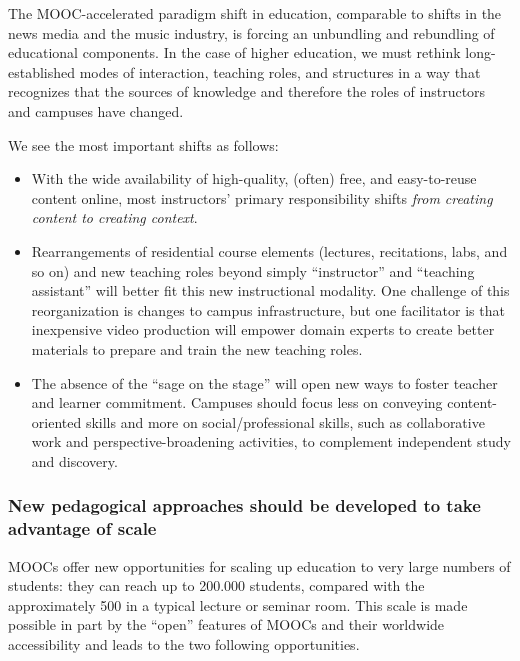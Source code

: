 \documentclass[a4paper,UKenglish]{dagman}
\begin{document}
The MOOC-accelerated paradigm shift in education, comparable to shifts in the news media and the
music industry, is forcing an unbundling and rebundling of educational components. In the case of
higher education, we must rethink long-established modes of interaction, teaching roles, and
structures in a way that recognizes that the sources of knowledge and therefore the roles of
instructors and campuses have changed.

We see the most important shifts as follows:

\begin{itemize}

\item With the wide availability of high-quality, (often) free, and easy-to-reuse content online,
  most instructors' primary responsibility shifts \emph{from creating content to creating context}.

\item Rearrangements of residential course elements (lectures, recitations, labs, and so on) and new
  teaching roles beyond simply ``instructor'' and ``teaching assistant'' will better fit this new
  instructional modality.  One challenge of this reorganization is changes to campus infrastructure,
  but one facilitator is that inexpensive video production will empower domain experts to create
  better materials to prepare and train the new teaching roles.

\item The absence of the ``sage on the stage'' will open new ways to foster teacher and learner
  commitment.  Campuses should focus less on conveying content-oriented skills and more on
  social/professional skills, such as collaborative work and perspective-broadening activities, to
  complement independent study and discovery.

\end{itemize} 

\subsubsection*{New pedagogical approaches should be developed to take advantage of scale}

MOOCs offer new opportunities for scaling up education to very large numbers of students: they can
reach up to 200.000 students, compared with the approximately 500 in a typical lecture or seminar
room.  This scale is made possible in part by the ``open'' features of MOOCs and their worldwide
accessibility and leads to the two following opportunities.
\end{document}
